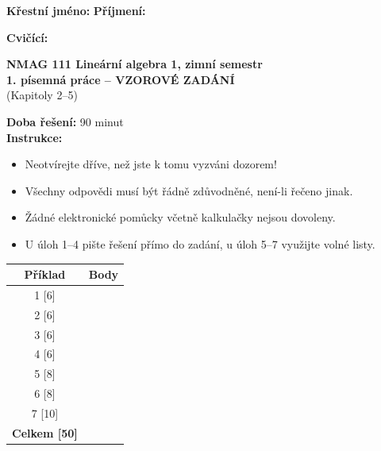 \documentclass[a4paper,11pt]{article}
\begin{document}
\noindent
\textbf{Křestní jméno:} \underline{\hspace{4cm}} \hfill \textbf{Příjmení:} \underline{\hspace{4cm}}

\vspace{5mm}

\noindent
\textbf{Cvičící:} \underline{\hspace{4cm}}

\vspace{10mm}

\begin{center}
    {\Large \textbf{NMAG 111 Lineární algebra 1, zimní semestr}} \\[3mm]
    {\large \textbf{1. písemná práce -- VZOROVÉ ZADÁNÍ}} \\[2mm]
    {\large (Kapitoly 2--5)}
\end{center}

\vspace{5mm}

\noindent
\textbf{Doba řešení:} 90 minut \\
\textbf{Instrukce:}
\begin{itemize}
    \item Neotvírejte dříve, než jste k tomu vyzváni dozorem!
    \item Všechny odpovědi musí být řádně zdůvodněné, není-li řečeno jinak.
    \item Žádné elektronické pomůcky včetně kalkulačky nejsou dovoleny.
    \item U úloh 1--4 pište řešení přímo do zadání, u úloh 5--7 využijte volné listy.
\end{itemize}

\vspace{5mm}

\begin{center}
\begin{tabular}{|c|c|}
\hline
\textbf{Příklad} & \textbf{Body} \\ \hline
1 [6] & \\ \hline
2 [6] & \\ \hline
3 [6] & \\ \hline
4 [6] & \\ \hline
5 [8] & \\ \hline
6 [8] & \\ \hline
7 [10] & \\ \hline
\textbf{Celkem [50]} & \\ \hline
\end{tabular}
\end{center}
\end{document}
